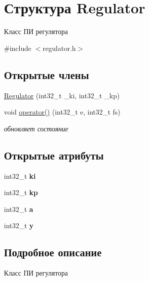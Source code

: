 \hypertarget{structRegulator}{}\section{Структура Regulator}
\label{structRegulator}


Класс ПИ регулятора  




{\ttfamily \#include $<$regulator.\+h$>$}

\subsection*{Открытые члены}
\begin{DoxyCompactItemize}
\item 
\hyperlink{structRegulator_a5e0dcb7d86f99631d5e64c9def236e12}{Regulator} (int32\+\_\+t \+\_\+ki, int32\+\_\+t \+\_\+kp)
\item 
void \hyperlink{structRegulator_a13fa9ed0cb46e28c80b2ec229bd7b67a}{operator()} (int32\+\_\+t e, int32\+\_\+t fs)
\begin{DoxyCompactList}\small\item\em обновляет состояние \end{DoxyCompactList}\end{DoxyCompactItemize}
\subsection*{Открытые атрибуты}
\begin{DoxyCompactItemize}
\item 
\mbox{\label{structRegulator_ac9b9ef0c40dc5f6ecb0fae4d00215e0b}} 
int32\+\_\+t {\bfseries ki}
\item 
\mbox{\label{structRegulator_a1004090e837e9ab80671354d597a23d6}} 
int32\+\_\+t {\bfseries kp}
\item 
\mbox{\label{structRegulator_a0dae4b43d6b2eaedd1d7850485fa54b5}} 
int32\+\_\+t {\bfseries a}
\item 
\mbox{\label{structRegulator_af3fd04cc0ce07479c39003abb01150cc}} 
int32\+\_\+t {\bfseries y}
\end{DoxyCompactItemize}


\subsection{Подробное описание}
Класс ПИ регулятора 

